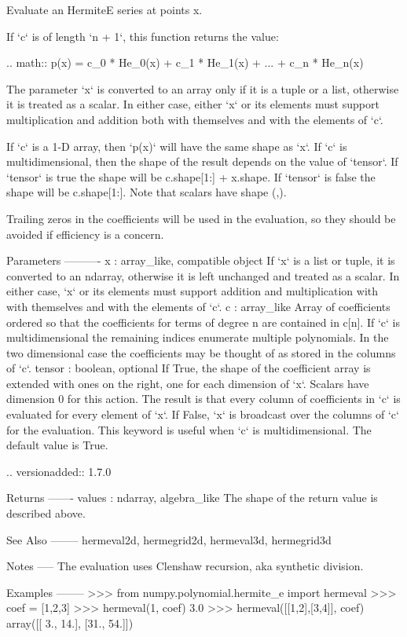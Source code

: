 \begin{DoxyVerb}Evaluate an HermiteE series at points x.

If `c` is of length `n + 1`, this function returns the value:

.. math:: p(x) = c_0 * He_0(x) + c_1 * He_1(x) + ... + c_n * He_n(x)

The parameter `x` is converted to an array only if it is a tuple or a
list, otherwise it is treated as a scalar. In either case, either `x`
or its elements must support multiplication and addition both with
themselves and with the elements of `c`.

If `c` is a 1-D array, then `p(x)` will have the same shape as `x`.  If
`c` is multidimensional, then the shape of the result depends on the
value of `tensor`. If `tensor` is true the shape will be c.shape[1:] +
x.shape. If `tensor` is false the shape will be c.shape[1:]. Note that
scalars have shape (,).

Trailing zeros in the coefficients will be used in the evaluation, so
they should be avoided if efficiency is a concern.

Parameters
----------
x : array_like, compatible object
    If `x` is a list or tuple, it is converted to an ndarray, otherwise
    it is left unchanged and treated as a scalar. In either case, `x`
    or its elements must support addition and multiplication with
    with themselves and with the elements of `c`.
c : array_like
    Array of coefficients ordered so that the coefficients for terms of
    degree n are contained in c[n]. If `c` is multidimensional the
    remaining indices enumerate multiple polynomials. In the two
    dimensional case the coefficients may be thought of as stored in
    the columns of `c`.
tensor : boolean, optional
    If True, the shape of the coefficient array is extended with ones
    on the right, one for each dimension of `x`. Scalars have dimension 0
    for this action. The result is that every column of coefficients in
    `c` is evaluated for every element of `x`. If False, `x` is broadcast
    over the columns of `c` for the evaluation.  This keyword is useful
    when `c` is multidimensional. The default value is True.

    .. versionadded:: 1.7.0

Returns
-------
values : ndarray, algebra_like
    The shape of the return value is described above.

See Also
--------
hermeval2d, hermegrid2d, hermeval3d, hermegrid3d

Notes
-----
The evaluation uses Clenshaw recursion, aka synthetic division.

Examples
--------
>>> from numpy.polynomial.hermite_e import hermeval
>>> coef = [1,2,3]
>>> hermeval(1, coef)
3.0
>>> hermeval([[1,2],[3,4]], coef)
array([[ 3., 14.],
       [31., 54.]])\end{DoxyVerb}
 \mbox{\label{namespacenumpy_1_1polynomial_1_1hermite__e_aca83941bc0b61a6ad3ab7c69809e313c}} 
